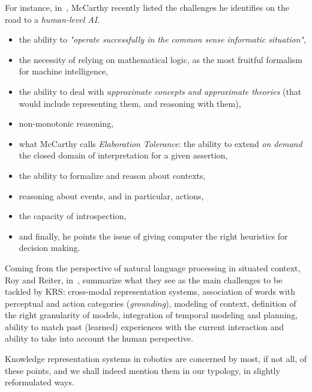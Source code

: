 For instance, in~\cite{McCarthy2007}, McCarthy recently listed the challenges
he identifies on the road to a \emph{human-level AI}.

\begin{itemize}

	\item the ability to \emph{"operate successfully in the common sense
	informatic situation"},

	\item the necessity of relying on mathematical logic, as the most fruitful
	formalism for machine intelligence,

	\item the ability to deal with \emph{approximate concepts and approximate
	theories} (that would include representing them, and reasoning with them),

	\item non-monotonic reasoning,

	\item what McCarthy calls \emph{Elaboration Tolerance}: the ability to
	extend \emph{on demand} the closed domain of interpretation for a
	given assertion,

	\item the ability to formalize and reason about contexts,

	\item reasoning about events, and in particular, actions,

	\item the capacity of introspection,

	\item and finally, he points the issue of giving computer the right
	heuristics for decision making.

\end{itemize}

Coming from the perspective of natural language processing in situated context,
Roy and Reiter, in~\cite{Roy2005}, summarize what they see as the main
challenges to be tackled by KRS: cross-modal representation systems,
association of words with perceptual and action categories (\emph{grounding}),
modeling of context, definition of the right granularity of models, integration
of temporal modeling and planning, ability to match past (learned) experiences
with the current interaction and ability to take into account the human
perspective.

Knowledge representation systems in robotics are concerned by most, if not all,
of these points, and we shall indeed mention them in our typology, in slightly
reformulated ways.


